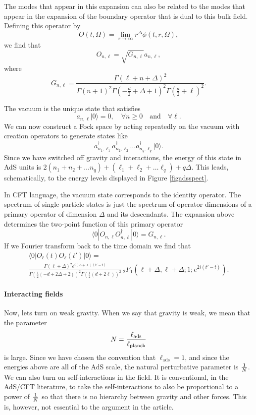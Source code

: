 \documentclass[12pt]{article}
\newcommand{\be}{\begin{equation}}
\newcommand{\ee}{\end{equation}}
\begin{document}
The modes that appear in this expansion can also be related to the modes that appear in the expansion of the boundary operator that is dual to this bulk field. Defining this operator by
\be
O(t, \Omega) = \lim_{r \rightarrow \infty} r^{\Delta} \phi(t, r, \Omega),
\ee
we find that
\be
O_{n, \ell} = \sqrt{G_{n, \ell}} a_{n, \ell},
\ee
where
\be
G_{n, \ell} = \frac{\Gamma (\ell+n+\Delta )^2}{\Gamma (n+1)^2 \Gamma \left(-\frac{d}{2}+\Delta +1\right)^2 \Gamma \left(\frac{d}{2}+\ell\right)^2}.
\ee


The vacuum is the unique state that satisfies
\be
a_{n, \ell} | 0 \rangle = 0, \quad \forall n \geq 0 \quad \text{and} \quad \forall \ell.
\ee
We can now construct a Fock space  by acting repeatedly on the vacuum
with creation operators to generate states like
\[
a_{n_1, \ell_1}^{\dagger} a_{n_2, \ell_2}^{\dagger} \ldots a_{n_q, \ell_q}^{\dagger} | 0 \rangle.
\]
Since we have switched off gravity and interactions, the energy of this state in AdS units is   $2 (n_1 + n_2 + \ldots n_q) + (\ell_1 + \ell_2 + \ldots \ell_q) + q \Delta$. This leads, schematically, to the energy levels displayed in Figure \ref{figadsspect}.

In CFT language, the vacuum state corresponds to the identity operator. The spectrum of single-particle states is just the spectrum of operator dimensions of a primary operator of dimension $\Delta$ and its descendants. The expansion above determines the two-point function of this primary operator
\be
\langle 0| O_{n, \ell} O_{n, \ell}^{\dagger} | 0 \rangle = G_{n, \ell}.
\ee
If we Fourier transform back to the time domain we find that
\begin{multline}
\langle 0| O_{\ell}(t) O_{\ell}(t') | 0 \rangle = \\
\frac{\Gamma (\ell+\Delta )^2 e^{i(\Delta +\ell)(t' - t)} }{\Gamma \left(\frac{1}{2} (-d+2 \Delta +2)\right)^2 \Gamma \left(\frac{1}{2} (d+2 \ell)\right)^2} \, _2F_1\left(\ell+\Delta ,\ell+\Delta ;1;e^{2 i (t' - t)}\right).
\end{multline}




\paragraph{\bf Interacting fields \\}
Now, lets turn on weak gravity. When we say that gravity is weak, we mean that the parameter
\be
N = {\ell_{\text{ads}} \over \ell_{\text{planck}}}
\ee
is large. Since we have chosen the convention that $\ell_{\text{ads}} = 1$, and since the energies above are all of the AdS scale, the natural perturbative parameter is ${1 \over N}$.  We can also turn on self-interactions in the field. It is conventional, in the AdS/CFT literature, to take the self-interactions to also be proportional to a power of ${1 \over N}$ so that there is no hierarchy between gravity and other forces. This is, however, not essential to the argument in the article.
\end{document}
